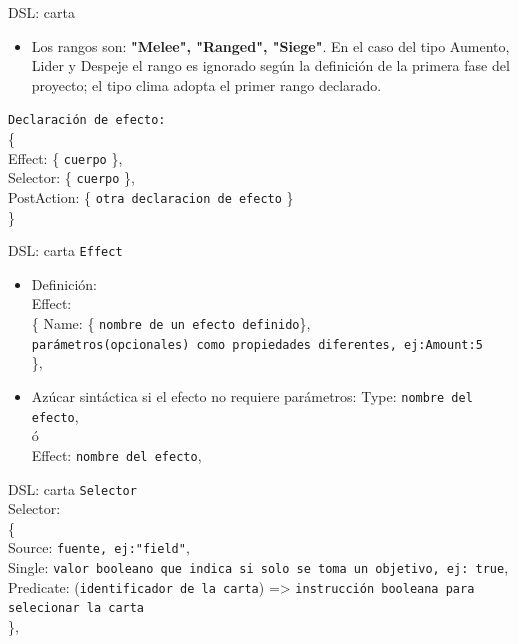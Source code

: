 \documentclass[a4paper, 12pt]{beamer}
\begin{document}
\begin{frame}{\textcolor{plata}{DSL: carta}}
\begin{itemize}
\item Los rangos son: \textbf{"Melee", "Ranged", "Siege"}. En el caso del tipo Aumento, Lider y Despeje el rango es ignorado según la definición de la primera fase del proyecto; el tipo clima adopta el primer rango declarado.
\end{itemize}
\texttt{Declaración de efecto:}\\
\{\\
\hspace{1cm} Effect: \{ \texttt{cuerpo} \},\\
\hspace{1cm} Selector: \{ \texttt{cuerpo} \},\\
\hspace{1cm} PostAction: \{ \texttt{otra declaracion de efecto} \}\\
\}
\end{frame}

\begin{frame}{\textcolor{plata}{DSL: carta}}
\texttt{Effect}\\
\begin{itemize}
\item Definición:\\
Effect:\\
\{
\hspace{1cm} Name: \{ \texttt{nombre de un efecto definido}\},\\
\hspace{1cm} \texttt{parámetros(opcionales) como propiedades diferentes, ej:Amount:5}\\
\},
\item Azúcar sintáctica si el efecto no requiere parámetros:
Type: \texttt{nombre del efecto},\\
ó\\
Effect: \texttt{nombre del efecto},
\end{itemize}
\end{frame}

\begin{frame}{\textcolor{plata}{DSL: carta}}
\texttt{Selector}\\
Selector:\\
\{\\
\hspace{1cm} Source: \texttt{fuente, ej:"field"},\\
\hspace{1cm} Single: \texttt{valor booleano que indica si solo se toma un objetivo, ej: true},\\
\hspace{1cm} Predicate: (\texttt{identificador de la carta}) => \texttt{instrucción booleana para selecionar la carta}\\
\},
\end{frame}
\end{document}
